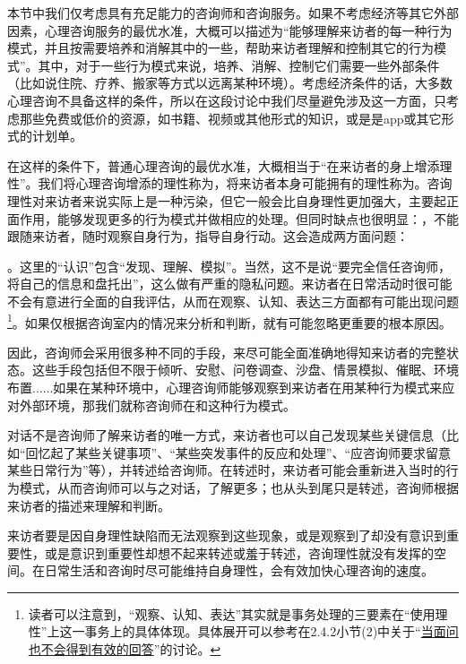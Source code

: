 
本节中我们仅考虑具有充足能力的咨询师和咨询服务。如果不考虑经济等其它外部因素，心理咨询服务的最优水准，大概可以描述为“能够理解来访者的每一种行为模式，并且按需要培养和消解其中的一些，帮助来访者理解和控制其它的行为模式”。其中，对于一些行为模式来说，培养、消解、控制它们需要一些外部条件（比如说住院、疗养、搬家等方式以远离某种环境）。考虑经济条件的话，大多数心理咨询不具备这样的条件，所以在这段讨论中我们尽量避免涉及这一方面，只考虑那些免费或低价的资源，如书籍、视频或其他形式的知识，或是是app或其它形式的计划单。

在这样的条件下，普通心理咨询的最优水准，大概相当于“在来访者的身上增添理性”。我们将心理咨询增添的理性称为，将来访者本身可能拥有的理性称为。咨询理性对来访者来说实际上是一种污染，但它一般会比自身理性更加强大，主要起正面作用，能够发现更多的行为模式并做相应的处理。但同时缺点也很明显：，不能跟随来访者，随时观察自身行为，指导自身行动。这会造成两方面问题：

。这里的“认识”包含“发现、理解、模拟”。当然，这不是说“要完全信任咨询师，将自己的信息和盘托出”，这么做有严重的隐私问题。来访者在日常活动时很可能不会有意进行全面的自我评估，从而在观察、认知、表达三方面都有可能出现问题\footnote{读者可以注意到，“观察、认知、表达”其实就是事务处理的三要素在“使用理性”上这一事务上的具体体现。具体展开可以参考在2.4.2小节(2)中关于“\hyperref[para:无效沟通]{当面问也不会得到有效的回答}”的讨论。}。如果仅根据咨询室内的情况来分析和判断，就有可能忽略更重要的根本原因。

因此，咨询师会采用很多种不同的手段，来尽可能全面准确地得知来访者的完整状态。这些手段包括但不限于倾听、安慰、问卷调查、沙盘、情景模拟、催眠、环境布置......如果在某种环境中，心理咨询师能够观察到来访者在用某种行为模式来应对外部环境，那我们就称咨询师在和这种行为模式。

对话不是咨询师了解来访者的唯一方式，来访者也可以自己发现某些关键信息（比如“回忆起了某些关键事项”、“某些突发事件的反应和处理”、“应咨询师要求留意某些日常行为”等），并转述给咨询师。在转述时，来访者可能会重新进入当时的行为模式，从而咨询师可以与之对话，了解更多；也从头到尾只是转述，咨询师根据来访者的描述来理解和判断。

来访者要是因自身理性缺陷而无法观察到这些现象，或是观察到了却没有意识到重要性，或是意识到重要性却想不起来转述或羞于转述，咨询理性就没有发挥的空间。在日常生活和咨询时尽可能维持自身理性，会有效加快心理咨询的速度。

